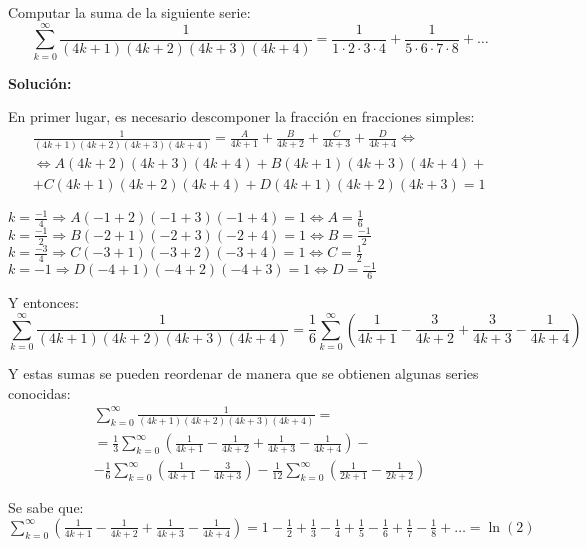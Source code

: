 \documentclass[../../main.tex]{subfiles}
\begin{document}
  \begin{shaded}
    Computar la suma de la siguiente serie:
    $$
    \sum_{k = 0}^\infty \frac{1}{(4k + 1)(4k + 2)(4k + 3)(4k + 4)} = \frac{1}{1 \cdot 2 \cdot 3 \cdot 4} + \frac{1}{5 \cdot 6 \cdot 7 \cdot 8} + \dots
    $$
  \end{shaded}

  \textbf{Solución:}

  En primer lugar, es necesario descomponer la fracción en fracciones simples:
  \begin{multline*}
    \frac{1}{(4k + 1)(4k + 2)(4k + 3)(4k + 4)} = \frac{A}{4k + 1} + \frac{B}{4k + 2} + \frac{C}{4k + 3} + \frac{D}{4k + 4} \iff \\ \iff
    A(4k + 2)(4k + 3)(4k + 4) + B(4k + 1)(4k + 3)(4k + 4) + \\ +
    C(4k + 1)(4k + 2)(4k + 4) + D(4k + 1)(4k + 2)(4k + 3) = 1
  \end{multline*}

  $k = \displaystyle\frac{-1}{4} \Longrightarrow A(-1 + 2)(-1 + 3)(-1 + 4) = 1 \iff A = \displaystyle\frac{1}{6}$
  $k = \displaystyle\frac{-1}{2} \Longrightarrow B(-2 + 1)(-2 + 3)(-2 + 4) = 1 \iff B = \displaystyle\frac{-1}{2}$
  $k = \displaystyle\frac{-3}{4} \Longrightarrow C(-3 + 1)(-3 + 2)(-3 + 4) = 1 \iff C = \displaystyle\frac{1}{2}$
  $k = -1 \Longrightarrow D(-4 + 1)(-4 + 2)(-4 + 3) = 1 \iff D = \displaystyle\frac{-1}{6}$

  Y entonces:
  $$
  \sum_{k = 0}^\infty \frac{1}{(4k + 1)(4k + 2)(4k + 3)(4k + 4)} = \frac{1}{6} \sum_{k = 0}^\infty \left( \frac{1}{4k + 1} - \frac{3}{4k + 2} + \frac{3}{4k + 3} - \frac{1}{4k + 4} \right)
  $$

  Y estas sumas se pueden reordenar de manera que se obtienen algunas series conocidas:
  \begin{multline*}
    \sum_{k = 0}^\infty \frac{1}{(4k + 1)(4k + 2)(4k + 3)(4k + 4)} = \\ =
    \frac{1}{3} \sum_{k = 0}^\infty \left( \frac{1}{4k + 1} - \frac{1}{4k + 2} + \frac{1}{4k + 3} - \frac{1}{4k + 4} \right) - \\ -
    \frac{1}{6} \sum_{k = 0}^\infty \left( \frac{1}{4k + 1} - \frac{3}{4k + 3} \right) - \frac{1}{12} \sum_{k = 0}^\infty \left(\frac{1}{2k + 1} - \frac{1}{2k + 2} \right)
  \end{multline*}

  Se sabe que:
  $\displaystyle\sum_{k = 0}^\infty \left( \displaystyle\frac{1}{4k + 1} - \displaystyle\frac{1}{4k + 2} + \displaystyle\frac{1}{4k + 3} - \displaystyle\frac{1}{4k + 4} \right) = 1 - \displaystyle\frac{1}{2} + \displaystyle\frac{1}{3} - \displaystyle\frac{1}{4} + \displaystyle\frac{1}{5} - \displaystyle\frac{1}{6} + \displaystyle\frac{1}{7} - \displaystyle\frac{1}{8} + \dots = \ln{(2)}$
\end{document}
